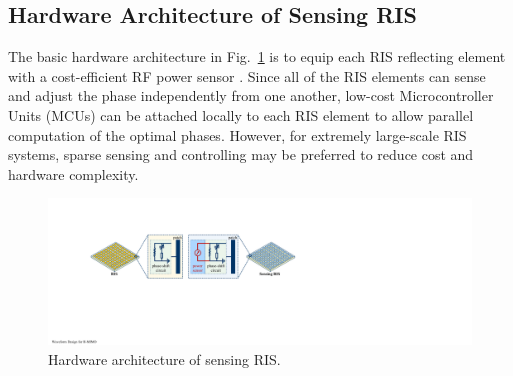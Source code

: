 \documentclass[12pt,draftclsnofoot,journal,onecolumn]{IEEEtran}
\theoremstyle{nonumberplain}
\begin{document}
\subsection{Hardware Architecture of Sensing RIS} \label{Hardware Architecture of Sensing RIS}
The basic hardware architecture in Fig.~\ref{fig:hardware} is to equip each RIS reflecting element with a cost-efficient RF power sensor \cite{ma2020smartsensing}. 
Since all of the RIS elements can sense and adjust the phase independently from one another, low-cost Microcontroller Units (MCUs) can be attached locally to each RIS element to allow parallel computation of the optimal phases. 
However, for extremely large-scale RIS systems, sparse sensing and controlling may be preferred to reduce cost and hardware complexity. 


    \begin{figure}[htbp]
        \centering
        \includegraphics[width=\textwidth]{figures/hardware.pdf}
        \caption{Hardware architecture of sensing RIS.}
        \label{fig:hardware}
    \end{figure}
\end{document}
